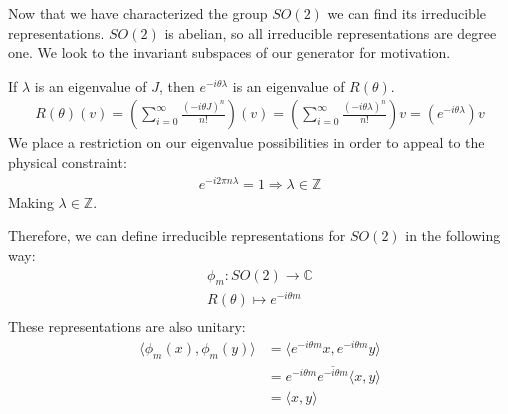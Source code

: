 \documentclass[compress,aspectratio=169,10pt,usenames,dvipsnames]{beamer}
\newcommand{\Z}{\mathbb{Z}}
\newcommand{\C}{\mathbb{C}}
\begin{document}
%
%
\begin{frame}
\vfill
Now that we have characterized the group $SO(2)$ we can find its irreducible representations. 
\vfill
$SO(2)$ is abelian, so all irreducible representations are degree one.
\vfill
We look to the invariant subspaces of our generator for motivation.
\end{frame}
%
%
\begin{frame}
\vfill
If $\lambda$ is an eigenvalue of $J$, then $e^{-i\theta\lambda}$ is an eigenvalue of $R(\theta)$.
\vfill
\begin{equation}
	\begin{aligned}
		R(\theta) (v) = \left(\sum_{i=0}^\infty \frac{(-i\theta J)^n}{n!}\right) (v) = \left(\sum_{i=0}^\infty \frac{(-i\theta \lambda)^n}{n!}\right)v = \left(e^{-i\theta \lambda}\right)v
	\end{aligned}
\end{equation}
\vfill
We place a restriction on our eigenvalue possibilities in order to appeal to the physical constraint:
\begin{equation}
	\begin{aligned}
		e^{-i2\pi n\lambda} = 1 \Rightarrow \lambda \in \Z
	\end{aligned}
\end{equation}
\vfill
Making $\lambda\in\Z$.

\end{frame}
%
%
\begin{frame}
\vfill
Therefore, we can define irreducible representations for $SO(2)$ in the following way:
\vfill
$$\begin{aligned}
	\phi_m:SO(2)\rightarrow \C \\
	R(\theta) \mapsto e^{-i\theta m} \\
\end{aligned}$$
\vfill
These representations are also unitary:
\vfill
\begin{equation}
	\begin{aligned}
		\langle \phi_m(x) , \phi_m(y) \rangle &= \langle e^{-i\theta m}x , e^{-i\theta m}y \rangle \\
												&= e^{-i\theta m}\overline{e^{-i\theta m}} \langle x , y \rangle\\
												&=\langle x , y \rangle
	\end{aligned}
\end{equation}
\vfill
\end{frame}
%
%
\end{document}
